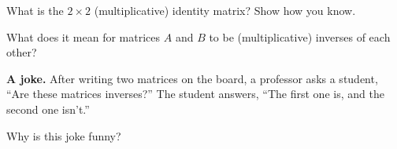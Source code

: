 \documentclass[space,handout,nooutcomes]{ximera}
\begin{document}
\begin{question}
What is the $2\times 2$ (multiplicative) identity matrix?  Show how you know.
%
\end{question}

\begin{question}
What does it mean for matrices $A$ and $B$ to be (multiplicative) inverses of each other?  
\end{question}

\textbf{A joke.}  After writing two matrices on the board, a professor asks a student, ``Are these matrices inverses?''  The student answers, ``The first one is, and the second one isn't.''  
\begin{question}
Why is this joke funny?  
\end{question}
\end{document}
